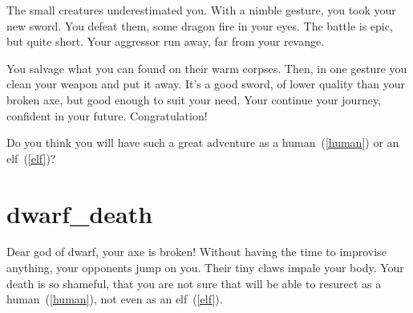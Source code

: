 The small creatures underestimated you. With a nimble gesture, you took your new
sword. You defeat them, some dragon fire in your eyes. The battle is epic, but
quite short. Your aggressor run away, far from your revange.

You salvage what you can found on their warm corpses. Then, in one gesture you
clean your weapon and put it away. It's a good sword, of lower quality than your
broken axe, but good enough to suit your need. Your continue your journey,
confident in your future. Congratulation!

Do you think you will have such a great adventure as a human~(\ref{human}) or
an elf~(\ref{elf})?

\section{dwarf_death}

Dear god of dwarf, your axe is broken! Without having the time to improvise
anything, your opponents jump on you. Their tiny claws impale your body. Your
death is so shameful, that you are not sure that will be able to resurect as a
human~(\ref{human}), not even as an elf~(\ref{elf}).
